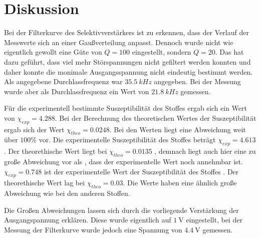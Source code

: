 \section{Diskussion}
\label{sec:diskussion}

Bei der Filterkurve des Selektivverstärkers ist zu erkennen, dass der Verlauf der Messwerte sich an einer Gaußverteilung
anpasst. Dennoch wurde nicht wie eigentlich gewollt eine Güte von $Q = 100$ eingestellt, sondern $Q = 20$. 
Das hat dazu geführt, dass viel mehr Störspannungen nicht gefiltert werden konnten und daher konnte die monimale Ausgangsspannung
nicht eindeutig bestimmt werden. Als angegebene Durchlassfrequenz war $\SI{35.5}{kHz}$ angegeben. Bei der Messung wurde aber
als Durchlassfrequenz ein Wert von $\SI{21.8}{kHz}$ gemessen.

Für die experimentell bestimmte Suszeptibilität des Stoffes  ergab sich ein Wert von $\chi_{exp} = 4.288$. 
Bei der Berechnung des theoretischen Wertes der Suszeptibilität ergab sich der Wert $\chi_{theo} = 0.0248$. Bei den Werten
liegt eine Abweichung weit über $100\%$ vor.
Die experimentelle Suszeptibilität des Stoffes  beträgt $\chi_{exp} = 4.613$. Der theorethische Wert liegt bei
$\chi_{theo} = 0.0135$ , demnach liegt auch hier eine zu große Abweichung vor als , dass der experimentelle Wert noch annehmbar ist.
$\chi_{exp} = 0.748$ ist der experimentelle Wert der Suszeptibilität des Stoffes . Der theorethische Wert lag bei
$\chi_{theo} = 0.03$. Die Werte haben eine ähnlich große Abweichung wie bei den anderen Stoffen.

Die Großen Abweichungen lassen sich durch die vorliegende Verstärkung der Ausgangspannung erklären.
Diese wurde eigentlich auf $\SI{1}{\volt}$ eingestellt, bei der Messung der Filterkurve wurde jedoch eine Spannung von $\SI{4.4}{\volt}$ gemessen.